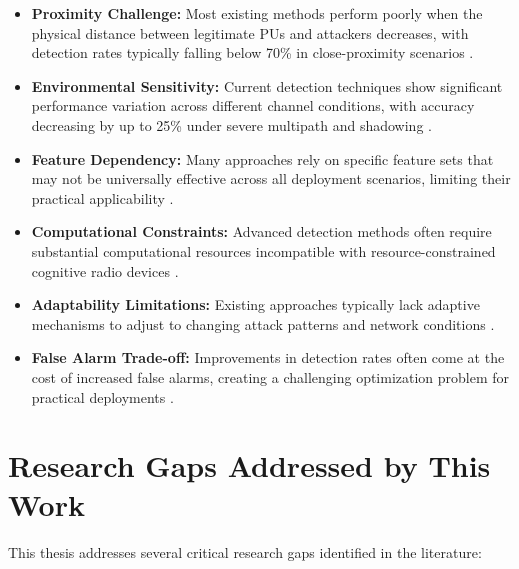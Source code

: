 \begin{itemize}
    \item \textbf{Proximity Challenge:} Most existing methods perform poorly when the physical distance between legitimate PUs and attackers decreases, with detection rates typically falling below 70\% in close-proximity scenarios \cite{khan2019proximity}.
    
    \item \textbf{Environmental Sensitivity:} Current detection techniques show significant performance variation across different channel conditions, with accuracy decreasing by up to 25\% under severe multipath and shadowing \cite{wu2018environmental}.
    
    \item \textbf{Feature Dependency:} Many approaches rely on specific feature sets that may not be universally effective across all deployment scenarios, limiting their practical applicability \cite{zhao2017feature}.
    
    \item \textbf{Computational Constraints:} Advanced detection methods often require substantial computational resources incompatible with resource-constrained cognitive radio devices \cite{lee2019computational}.
    
    \item \textbf{Adaptability Limitations:} Existing approaches typically lack adaptive mechanisms to adjust to changing attack patterns and network conditions \cite{adesina2020adaptability}.
    
    \item \textbf{False Alarm Trade-off:} Improvements in detection rates often come at the cost of increased false alarms, creating a challenging optimization problem for practical deployments \cite{gao2018tradeoff}.
\end{itemize}

\section{Research Gaps Addressed by This Work}

This thesis addresses several critical research gaps identified in the literature:

